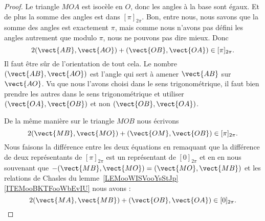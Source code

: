 \begin{proof}
    Le triangle \( MOA\) est isocèle en \( O\), donc les angles à la base sont égaux. Et de plus la somme des angles est dans \( [\pi]_{2\pi}\). Bon, entre nous, nous savons que la somme des angles est exactement \( \pi\), mais comme nous n'avons pas défini les angles autrement que modulo \( \pi\), nous ne pouvons pas dire mieux. Donc
    \begin{equation}
        2(\vect{ AB },\vect{ AO })+(\vect{ OB },\vect{ OA })\in [\pi]_{2\pi}.
    \end{equation}
    Il faut être sûr de l'orientation de tout cela. Le nombre \( (\vect{ AB },\vect{ AO })\) est l'angle qui sert à amener \( \vect{ AB }\) sur \( \vect{ AO }\). Vu que nous l'avons choisi dans le sens trigonométrique, il faut bien prendre les autres dans le sens trigonométrique et utiliser \( (\vect{ OA }, \vect{ OB })\) et non \( (\vect{ OB },\vect{ OA })\).

\begin{center}
   
\end{center}

De la même manière sur le triangle \( MOB\) nous écrivons
\begin{equation}
    2(\vect{ MB },\vect{ MO })+(\vect{ OM },\vect{ OB })\in[\pi]_{2\pi}.
\end{equation}
Nous faisons la différence entre les deux équations en remaquant que la différence de deux représentants de \( [\pi]_{2\pi}\) est un représentant de \( [0]_{2\pi}\) et en en nous souvenant que \( -(\vect{ MB },\vect{ MO })=(\vect{ MO },\vect{ MB })\) et les relations de Chasles du lemme~\ref{LEMooWISVooYsStJp}\ref{ITEMooBKTFooWbEvIU} nous avons :
\begin{equation}
    2(\vect{ MA },\vect{ MB })+(\vect{ OB },\vect{ OA })\in[0]_{2\pi}.
\end{equation}
\end{proof}

